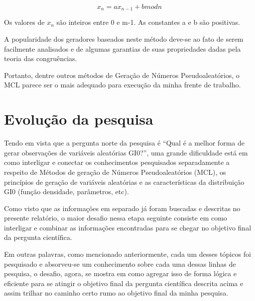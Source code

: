 \begin{equation}
	x_{n} = ax_{n-1} + b mod n
\end{equation}

Os valores de \begin{math} x_{n} \end{math} são inteiros entre 0 e m-1. As constantes a e b são positivas.

A popularidade dos geradores baseados neste método deve-se ao fato de serem facilmente
analisados e de algumas garantias de suas propriedades dadas pela teoria das congruências.

Portanto, dentre outros métodos de Geração de Números Pseudoaleatórios, o MCL parece ser o mais adequado para execução da minha frente de trabalho.

\newpage
\section{Evolução da pesquisa}

Tendo em vista que a pergunta norte da pesquisa é “Qual é a melhor forma de gerar observações de variáveis aleatórias GI0?”, uma grande dificuldade está em como interligar e conectar os conhecimentos pesquisados separadamente a respeito de Métodos de geração de Números Pseudoaleatórios (MCL), os princípios de geração de variáveis aleatórias e as características da distribuição GI0 (função densidade, parâmetros, etc).

Como visto que as informações em separado já foram buscadas e descritas no presente relatório, o maior desafio nessa etapa seguinte consiste em como interligar e combinar as informações encontradas para se chegar no objetivo final da pergunta científica.

Em outras palavras, como mencionado anteriormente, cada um desses tópicos foi pesquisado e absorveu-se um conhecimento sobre cada uma dessas linhas de pesquisa, o desafio, agora, se mostra em como agregar isso de forma lógica e eficiente para se atingir o objetivo final da pergunta científica descrita acima e assim trilhar no caminho certo rumo ao objetivo final da minha pesquisa.



